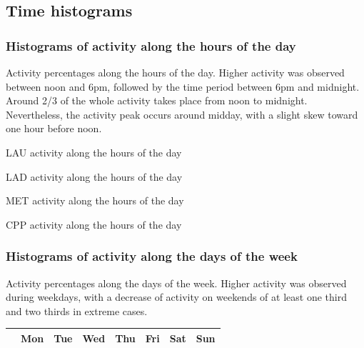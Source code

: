 \documentclass[%
 aip,
 jmp,%
 amsmath,amssymb,
 reprint,%
 floatfix,
]{revtex4-1}
\begin{document}
\FloatBarrier
\subsection{Time histograms}
\subsubsection{Histograms of activity along the hours of the day}\label{si:hours}

Activity percentages along the hours of the day. Higher activity was observed between noon and 6pm, followed by the time period between 6pm and midnight. Around 2/3 of the whole activity takes place from noon to midnight. Nevertheless, the activity peak occurs around midday, with a slight skew toward one hour before noon.
\begin{table}[!h]
	\caption{LAU activity along the hours of the day}
	\footnotesize
	
\end{table}

\begin{table}[!h]
	\caption{LAD activity along the hours of the day}
	\footnotesize
	
\end{table}

\begin{table}[!h]
	\caption{MET activity along the hours of the day}
	\footnotesize
	
\end{table}

\begin{table}[!h]
	\caption{CPP activity along the hours of the day}
	\footnotesize
	
\end{table}

\FloatBarrier
\subsubsection{Histograms of activity along the days of the week}

Activity percentages along the days of the week. Higher activity was observed during weekdays, with a decrease of activity on weekends of at least one third and two thirds in extreme cases.

\begin{table}[!h]
\begin{center}
    \begin{tabular}{ | l |  c | c | c | c | c |   c | c |}
        \hline
        & Mon & Tue & Wed & Thu & Fri & Sat & Sun  \\ \hline
	
    \end{tabular}
\end{center}
\label{tab:win}
\end{table}
\end{document}
